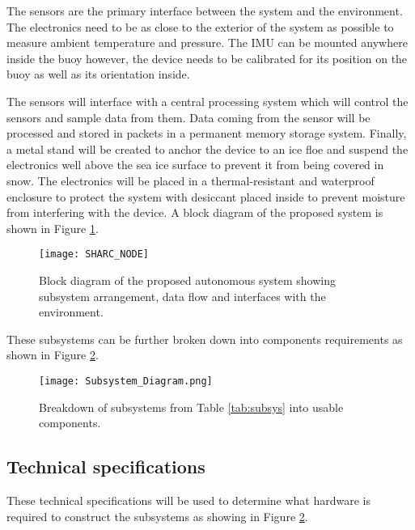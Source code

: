 The sensors are the primary interface between the system and the environment. The electronics need to be as close to the exterior of the system as possible to measure ambient temperature and pressure. The IMU can be mounted anywhere inside the buoy however, the device needs to be calibrated for its position on the buoy as well as its orientation inside. \par

The sensors will interface with a central processing system which will control the sensors and sample data from them. Data coming from the sensor will be processed and stored in packets in a permanent memory storage system. Finally, a metal stand will be created to anchor the device to an ice floe and suspend the electronics well above the sea ice surface to prevent it from being covered in snow. The electronics will be placed in a thermal-resistant and waterproof enclosure to protect the system with desiccant placed inside to prevent moisture from interfering with the device. A block diagram of the proposed system is shown in Figure \ref{mbuoy}.

\begin{figure}[H]
  \centering
  \texttt{[image: SHARC\_NODE]}
  \caption{Block diagram of the proposed autonomous system showing subsystem arrangement, data flow and interfaces with the environment.}
  \label{mbuoy}
\end{figure}

These subsystems can be further broken down into components requirements as shown in Figure \ref{fig:ss_breakdown}.

\begin{figure}[H]
  \centering
  \texttt{[image: Subsystem\_Diagram.png]}
  \caption{Breakdown of subsystems from Table \ref{tab:subsys} into usable components.}
  \label{fig:ss_breakdown}
\end{figure}



\subsection{Technical specifications}

These technical specifications will be used to determine what hardware is required to construct the subsystems as showing in Figure \ref{fig:ss_breakdown}.


